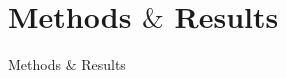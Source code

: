 \documentclass[UKenglish]{beamer}
\begin{document}
\section{Methods $\&$ Results}
\begin{frame}{Methods $\&$ Results}
    \tableofcontents[currentsection]
\end{frame}



\end{document}
